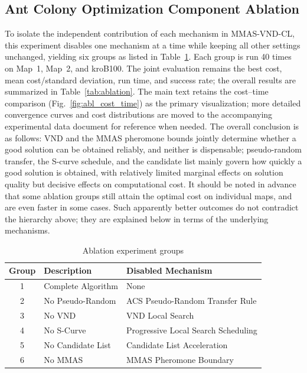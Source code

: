 \subsection{Ant Colony Optimization Component Ablation}
\label{subsec:exp_ablation}

To isolate the independent contribution of each mechanism in MMAS-VND-CL, this experiment disables one mechanism at a time while keeping all other settings unchanged, yielding six groups as listed in Table~\textcolor{blue}{\ref{tab:ablation_groups}}. Each group is run 40 times on Map~1, Map~2, and kroB100. The joint evaluation remains the best cost, mean cost/standard deviation, run time, and success rate; the overall results are summarized in Table~\textcolor{blue}{\ref{tab:ablation}}. The main text retains the cost--time comparison (Fig.~\ref{fig:abl_cost_time}) as the primary visualization; more detailed convergence curves and cost distributions are moved to the accompanying experimental data document for reference when needed. The overall conclusion is as follows: VND and the MMAS pheromone bounds jointly determine whether a good solution can be obtained reliably, and neither is dispensable; pseudo-random transfer, the S-curve schedule, and the candidate list mainly govern how quickly a good solution is obtained, with relatively limited marginal effects on solution quality but decisive effects on computational cost. It should be noted in advance that some ablation groups still attain the optimal cost on individual maps, and are even faster in some cases. Such apparently better outcomes do not contradict the hierarchy above; they are explained below in terms of the underlying mechanisms.

\begin{table}[!t]
\caption{Ablation experiment groups}
\label{tab:ablation_groups}
\centering
\small
\setlength{\tabcolsep}{4pt}
\begin{tabular}{cll}
\toprule
Group & Description & Disabled Mechanism \\
\midrule
1 & Complete Algorithm & None \\
2 & No Pseudo-Random & ACS Pseudo-Random Transfer Rule \\
3 & No VND & VND Local Search \\
4 & No S-Curve & Progressive Local Search Scheduling \\
5 & No Candidate List & Candidate List Acceleration \\
6 & No MMAS & MMAS Pheromone Boundary \\
\bottomrule
\end{tabular}
\end{table}

